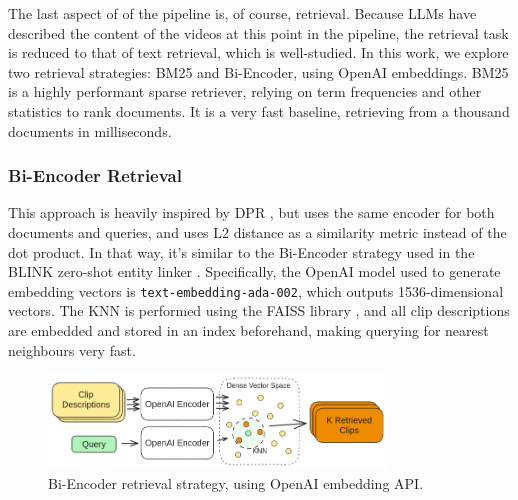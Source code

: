 The last aspect of of the pipeline is, of course, retrieval.
Because LLMs have described the content of the videos at this point in the pipeline, the retrieval task is reduced to that of text retrieval, which is well-studied.
In this work, we explore two retrieval strategies: BM25 and Bi-Encoder, using OpenAI embeddings.
BM25 is a highly performant sparse retriever, relying on term frequencies and other statistics to rank documents.
It is a very fast baseline, retrieving from a thousand documents in milliseconds.

\subsubsection{Bi-Encoder Retrieval}
This approach is heavily inspired by DPR \cite{dpr}, but uses the same encoder for both documents and queries, and uses L2 distance as a similarity metric instead of the dot product.
In that way, it's similar to the Bi-Encoder strategy used in the BLINK zero-shot entity linker \cite{blink}.
Specifically, the OpenAI model used to generate embedding vectors is \verb|text-embedding-ada-002|, which outputs 1536-dimensional vectors.
The KNN is performed using the FAISS library \cite{faiss}, and all clip descriptions are embedded and stored in an index beforehand, making querying for nearest neighbours very fast.

\begin{figure}
      \centering
      \includegraphics[width=0.8\textwidth]{figures/openai_DPR.png}
      \caption{Bi-Encoder retrieval strategy, using OpenAI embedding API.}
      \label{fig:bienc}
\end{figure}

